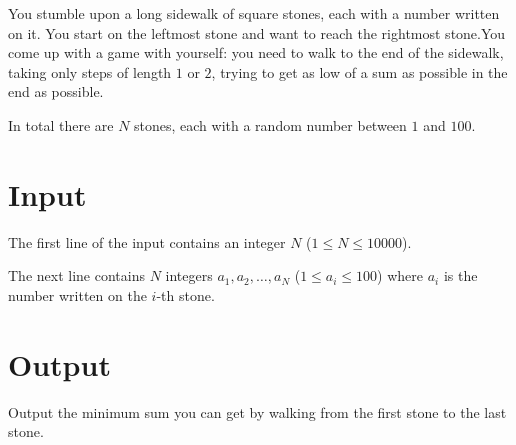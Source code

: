 You stumble upon a long sidewalk of square stones, each with a number written on it. You start on the leftmost stone
and want to reach the rightmost stone.You come up with a game with yourself: you need to walk to the end of the sidewalk,
taking only steps of length \(1\) or \(2\), trying to get as low of a sum as possible in the end as possible.

In total there are \(N\) stones, each with a random number between \(1\) and \(100\).

\section*{Input}
The first line of the input contains an integer \(N\) (\(1 \le N \le 10000\)).

The next line contains \(N\) integers \(a_1, a_2, \ldots, a_N\) (\(1 \le a_i \le 100\)) where \(a_i\) is the number written on the \(i\)-th stone.

\section*{Output}
Output the minimum sum you can get by walking from the first stone to the last stone.